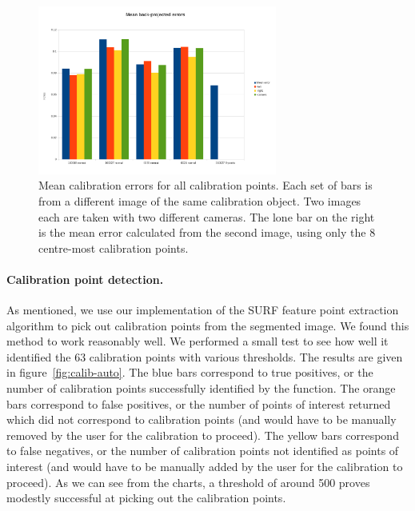 \begin{figure}[htb]
  \centering
  \includegraphics[width=0.7\textwidth]{figures/calibration-means}
  \caption[Mean calibration errors]{Mean calibration errors for all
    calibration points. Each set of bars is from a different image of
    the same calibration object. Two images each are taken with two
    different cameras. The lone bar on the right
    is the mean error calculated from the second image, using only
    the 8 centre-most calibration points.}
  \label{fig:calib-errors}
\end{figure}

\paragraph{Calibration point detection.}
As mentioned, we use our implementation of the SURF feature point extraction algorithm to pick out calibration points from the segmented image. We found this method to work reasonably well. We performed a small test to see how well it identified the 63 calibration points with various thresholds. The results are given in figure~\ref{fig:calib-auto}. The blue bars correspond to true positives, or the number of calibration points successfully identified by the function. The orange bars correspond to false positives, or the number of points of interest returned which did not correspond to calibration points (and would have to be manually removed by the user for the calibration to proceed). The yellow bars correspond to false negatives, or the number of calibration points not identified as points of interest (and would have to be manually added by the user for the calibration to proceed). As we can see from the charts, a threshold of around 500 proves modestly successful at picking out the calibration points.

